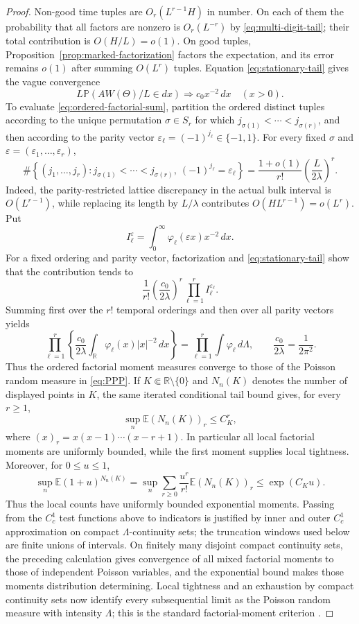 \documentclass[11pt,a4paper]{amsart}
\theoremstyle{definition}
\theoremstyle{remark}
\newcommand{\R}{\mathbb R}
\newcommand{\E}{\mathbb E}
\newcommand{\Pp}{\mathbb P}
\begin{document}
\begin{proof}
Non-good time tuples are $O_r(L^{r-1}H)$ in number.  On each of them the
probability that all factors are nonzero is $O_r(L^{-r})$ by
\eqref{eq:multi-digit-tail}; their total contribution is $O(H/L)=o(1)$.
On good tuples, Proposition~\ref{prop:marked-factorization} factors the
expectation, and its error remains $o(1)$ after summing $O(L^r)$ tuples.
Equation \eqref{eq:stationary-tail} gives the vague convergence
\[
 L\Pp(AW(\Theta)/L\in dx)\Longrightarrow c_0x^{-2}\,dx
 \quad(x>0).
\]
To evaluate \eqref{eq:ordered-factorial-sum}, partition the ordered distinct
tuples according to the unique permutation $\sigma\in S_r$ for which
$j_{\sigma(1)}<\cdots<j_{\sigma(r)}$, and then according to the parity vector
$\varepsilon_\ell=(-1)^{j_\ell}\in\{-1,1\}$.  For every fixed
$\sigma$ and $\varepsilon=(\varepsilon_1,\ldots,\varepsilon_r)$,
\begin{equation}\label{eq:parity-tuple-count}
 \#\left\{(j_1,\ldots,j_r):
 j_{\sigma(1)}<\cdots<j_{\sigma(r)},\
 (-1)^{j_\ell}=\varepsilon_\ell\right\}
 =\frac{1+o(1)}{r!}\left(\frac{L}{2\lambda}\right)^r.
\end{equation}
Indeed, the parity-restricted lattice discrepancy in the actual bulk interval
is $O(L^{r-1})$, while replacing its length by $L/\lambda$ contributes
$O(HL^{r-1})=o(L^r)$.  Put
\[
 I_\ell^{\varepsilon}
 =\int_0^\infty\varphi_\ell(\varepsilon x)x^{-2}\,dx.
\]
For a fixed ordering and parity vector, factorization and
\eqref{eq:stationary-tail} show that the contribution tends to
\[
 \frac1{r!}\left(\frac{c_0}{2\lambda}\right)^r
 \prod_{\ell=1}^r I_\ell^{\varepsilon_\ell}.
\]
Summing first over the $r!$ temporal orderings and then over all parity
vectors yields
\[
 \prod_{\ell=1}^r
 \left\{\frac{c_0}{2\lambda}
 \int_{\R}\varphi_\ell(x)|x|^{-2}\,dx\right\}
 =\prod_{\ell=1}^r\int\varphi_\ell\,d\Lambda,
 \qquad \frac{c_0}{2\lambda}=\frac1{2\pi^2}.
\]
Thus the ordered factorial moment measures converge to those of the Poisson
random measure in \eqref{eq:PPP}.  If $K\Subset\R\setminus\{0\}$ and
$N_n(K)$ denotes the number of displayed points in $K$, the same iterated
conditional tail bound gives, for every $r\ge1$,
\[
 \sup_n\E (N_n(K))_r\le C_K^r,
\]
where $(x)_r=x(x-1)\cdots(x-r+1)$.  In particular all local factorial
moments are uniformly bounded, while the first moment supplies local
tightness.  Moreover, for $0\le u\le1$,
\[
 \sup_n\E(1+u)^{N_n(K)}
 =\sup_n\sum_{r\ge0}\frac{u^r}{r!}\E(N_n(K))_r
 \le \exp(C_Ku).
\]
Thus the local counts have uniformly bounded exponential moments.
Passing from the $C_c^1$ test functions above to indicators is justified by
inner and outer $C_c^1$ approximation on compact $\Lambda$-continuity sets;
the truncation windows used below are finite unions of intervals.
On finitely many disjoint compact continuity sets, the preceding calculation
gives convergence of all mixed factorial moments to those of independent
Poisson variables, and the exponential bound makes those moments
distribution determining.  Local tightness and an exhaustion by compact
continuity sets now identify every subsequential limit as the Poisson random
measure with intensity $\Lambda$; this is the standard factorial-moment
criterion \cite[Chap.~4]{Kallenberg17}.
\end{proof}
\end{document}
